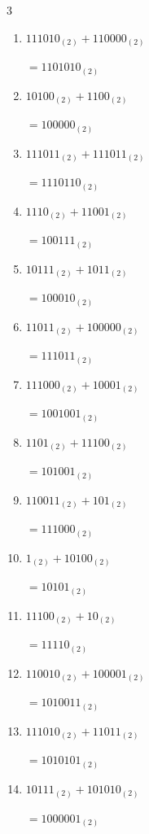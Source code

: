 \begin{multicols}{3}
\begin{enumerate}
  \item $111010_{(2)} + 110000_{(2)}$

        $=1101010_{(2)}$

  \item $10100_{(2)} + 1100_{(2)}$

        $=100000_{(2)}$

  \item $111011_{(2)} + 111011_{(2)}$

        $=1110110_{(2)}$

  \item $1110_{(2)} + 11001_{(2)}$

        $=100111_{(2)}$

  \item $10111_{(2)} + 1011_{(2)}$

        $=100010_{(2)}$

  \item $11011_{(2)} + 100000_{(2)}$

        $=111011_{(2)}$

  \item $111000_{(2)} + 10001_{(2)}$

        $=1001001_{(2)}$

  \item $1101_{(2)} + 11100_{(2)}$

        $=101001_{(2)}$

\columnbreak %

  \item $110011_{(2)} + 101_{(2)}$

        $=111000_{(2)}$

  \item $1_{(2)} + 10100_{(2)}$

        $=10101_{(2)}$

  \item $11100_{(2)} + 10_{(2)}$

        $=11110_{(2)}$

  \item $110010_{(2)} + 100001_{(2)}$

        $=1010011_{(2)}$

  \item $111010_{(2)} + 11011_{(2)}$

        $=1010101_{(2)}$

  \item $10111_{(2)} + 101010_{(2)}$

        $=1000001_{(2)}$


\end{enumerate}
\end{multicols}
